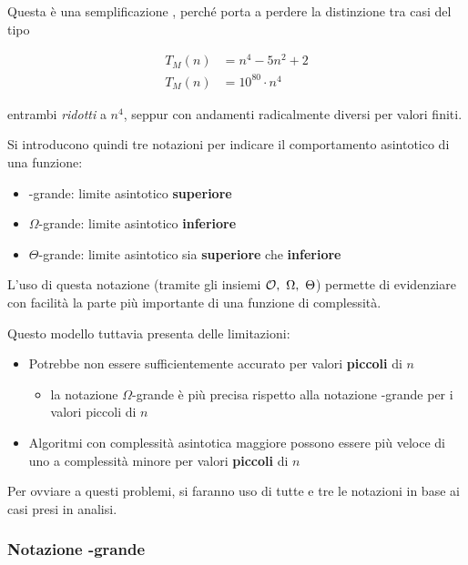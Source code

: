 \documentclass[italian, 10pt]{article}
\begin{document}
Questa è una semplificazione , perché porta a perdere la distinzione tra casi del tipo

\begin{align*}
  T_M(n) & = n^4 - 5n^2 + 2    \\
  T_M(n) & = 10^{80} \cdot n^4
\end{align*}

entrambi \textit{ridotti} a \(n^4\), seppur con andamenti radicalmente diversi per valori finiti.

\bigskip
Si introducono quindi tre notazioni per indicare il comportamento asintotico di una funzione:
\begin{itemize}
  \item \bigO-grande: limite asintotico \textbf{superiore}
  \item \(\Omega\)-grande: limite asintotico \textbf{inferiore}
  \item \(\Theta\)-grande: limite asintotico sia \textbf{superiore} che \textbf{inferiore}
\end{itemize}

L'uso di questa notazione (tramite gli insiemi \(\mathcal{O},\ \Omega,\ \Theta\)) permette di evidenziare con facilità la parte più importante di una funzione di complessità.

Questo modello tuttavia presenta delle limitazioni:

\begin{itemize}
  \item Potrebbe non essere sufficientemente accurato per valori \textbf{piccoli} di \(n\)
        \begin{itemize}
          \item la notazione \(\Omega\)-grande è più precisa rispetto alla notazione \bigO-grande per i valori piccoli di \(n\)
        \end{itemize}
  \item Algoritmi con complessità asintotica maggiore possono essere più veloce di uno a complessità minore per valori \textbf{piccoli} di \(n\)
\end{itemize}

Per ovviare a questi problemi, si faranno uso di tutte e tre le notazioni in base ai casi presi in analisi.

\subsubsection[Notazione O-grande]{Notazione \bigO-grande}
\end{document}
